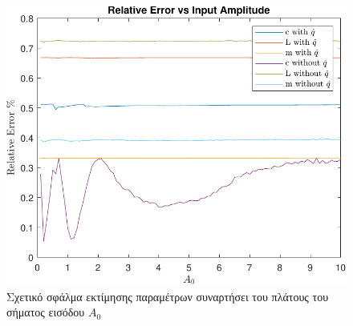 \documentclass[a4paper,12pt]{article}
\begin{document}
\begin{figure}[h!]
    \centering
    \includegraphics[width=0.5\linewidth]{plot/task3_parameter_estimation_error_vs_input_amplitude.pdf}
    \caption{Σχετικό σφάλμα εκτίμησης παραμέτρων συναρτήσει του πλάτους του σήματος εισόδου $A_0$}
    \label{fig:task3_parameter_estimation_error_vs_input_amplitude}
\end{figure}
\end{document}
